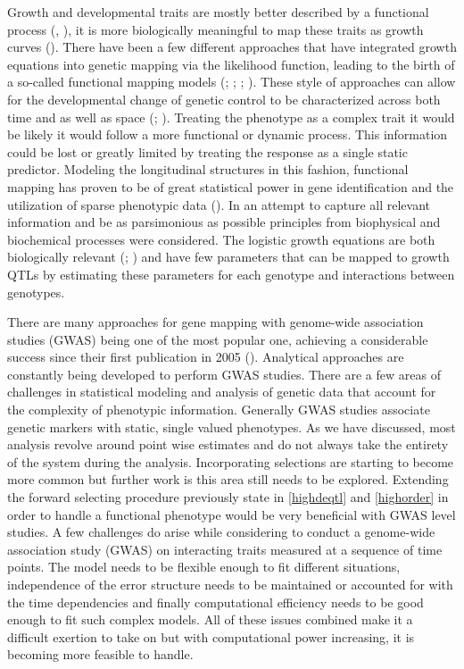 \documentclass[11pt,]{book}
\theoremstyle{definition}
\theoremstyle{definition}
\theoremstyle{remark}
\begin{document}
Growth and developmental traits are mostly better described by a
functional process (\cite{hernandez2015understanding},
\cite{muraya2017genetic}), it is more biologically meaningful to map
these traits as growth curves (\cite{sun2015mapping}). There have been a
few different approaches that have integrated growth equations into
genetic mapping via the likelihood function, leading to the birth of a
so-called functional mapping models (\cite{ma2002functional};
\cite{wu2006functional}; \cite{li2015dynamic};
\cite{muraya2017genetic}). These style of approaches can allow for the
developmental change of genetic control to be characterized across both
time and as well as space (\cite{he2010mapping};
\cite{li2010functional}). Treating the phenotype as a complex trait it
would be likely it would follow a more functional or dynamic process.
This information could be lost or greatly limited by treating the
response as a single static predictor. Modeling the longitudinal
structures in this fashion, functional mapping has proven to be of great
statistical power in gene identification and the utilization of sparse
phenotypic data (\cite{hou2006framework}). In an attempt to capture all
relevant information and be as parsimonious as possible principles from
biophysical and biochemical processes were considered. The logistic
growth equations are both biologically relevant (\cite{west2001general};
\cite{sun2014model}) and have few parameters that can be mapped to
growth QTLs by estimating these parameters for each genotype and
interactions between genotypes.

There are many approaches for gene mapping with genome-wide association
studies (GWAS) being one of the most popular one, achieving a
considerable success since their first publication in 2005
(\cite{klein2005complement}). Analytical approaches are constantly being
developed to perform GWAS studies. There are a few areas of challenges
in statistical modeling and analysis of genetic data that account for
the complexity of phenotypic information. Generally GWAS studies
associate genetic markers with static, single valued phenotypes. As we
have discussed, most analysis revolve around point wise estimates and do
not always take the entirety of the system during the analysis.
Incorporating selections are starting to become more common but further
work is this area still needs to be explored. Extending the forward
selecting procedure previously state in \ref{highdeqtl} and
\ref{highorder} in order to handle a functional phenotype would be very
beneficial with GWAS level studies. A few challenges do arise while
considering to conduct a genome-wide association study (GWAS) on
interacting traits measured at a sequence of time points. The model
needs to be flexible enough to fit different situations, independence of
the error structure needs to be maintained or accounted for with the
time dependencies and finally computational efficiency needs to be good
enough to fit such complex models. All of these issues combined make it
a difficult exertion to take on but with computational power increasing,
it is becoming more feasible to handle.
\end{document}
